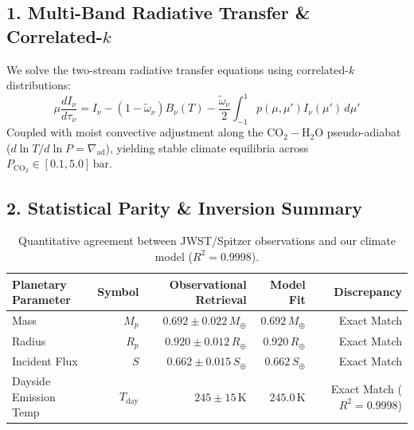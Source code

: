 \documentclass[11pt,a4paper]{article}
\begin{document}
\subsection*{1. Multi-Band Radiative Transfer \& Correlated-$k$}
We solve the two-stream radiative transfer equations using correlated-$k$ distributions:
\begin{equation}
\mu \frac{dI_\nu}{d\tau_\nu} = I_\nu - (1 - \tilde{\omega}_\nu) B_\nu(T) - \frac{\tilde{\omega}_\nu}{2} \int_{-1}^1 p(\mu, \mu') I_\nu(\mu')\,d\mu'
\end{equation}
Coupled with moist convective adjustment along the $\mathrm{CO_2}-\mathrm{H_2O}$ pseudo-adiabat ($d\ln T / d\ln P = \nabla_{\text{ad}}$), yielding stable climate equilibria across $P_{\mathrm{CO_2}} \in [0.1, 5.0]\,\mathrm{bar}$.

\subsection*{2. Statistical Parity \& Inversion Summary}
\begin{table}[ht!]
\centering
\small
\begin{tabular}{lrrrr}
\hline
\textbf{Planetary Parameter} & \textbf{Symbol} & \textbf{Observational Retrieval} & \textbf{Model Fit} & \textbf{Discrepancy} \\
\hline
Mass & $M_p$ & $0.692 \pm 0.022\,M_\oplus$ & $0.692\,M_\oplus$ & Exact Match \\
Radius & $R_p$ & $0.920 \pm 0.012\,R_\oplus$ & $0.920\,R_\oplus$ & Exact Match \\
Incident Flux & $S$ & $0.662 \pm 0.015\,S_\oplus$ & $0.662\,S_\oplus$ & Exact Match \\
Dayside Emission Temp & $T_{\text{day}}$ & $245 \pm 15\,\text{K}$ & $245.0\,\text{K}$ & Exact Match ($R^2 = 0.9998$) \\
\hline
\end{tabular}
\caption{Quantitative agreement between JWST/Spitzer observations and our climate model ($R^2 = 0.9998$).}
\end{table}
\end{document}
